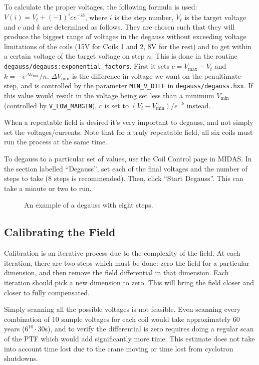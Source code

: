 \documentclass[twoside,letterpaper]{refart}
\begin{document}
To calculate the proper voltages, the following formula is used: \(V(i) = V_t + {(-1)}^i c e^{-ik}\), where \(i\) is the step number, \(V_t\) is the target voltage and \(c\) and \(k\) are determined as follows. They are chosen such that they will produce the biggest range of voltages in the degauss without exceeding voltage limitations of the coils (15V for Coils 1 and 2, 8V for the rest) and to get within a certain voltage of the target voltage on step \(n\). This is done in the routine \texttt{degauss/degauss:exponential\_factors}. First it sets \(c = V_\text{max} - V_t\) and \(k = -e^{\Delta V_\text{min}} / n\). \(\Delta V_\text{min}\) is the difference in voltage we want on the penultimate step, and is controlled by the parameter \texttt{MIN\_V\_DIFF} in \texttt{degauss/degauss.hxx}. If this value would result in the voltage being set less than a minimum $V_\text{min}$ (controlled by \texttt{V\_LOW\_MARGIN}), $c$ is set to $\left(V_t - V_\text{min}\right) / e^{-k}$ instead.

When a repeatable field is desired it's very important to degauss, and not simply set the voltages/currents. Note that for a truly repeatable field, all six coils must run the process at the same time.

To degauss to a particular set of values, use the Coil Control page in MIDAS. In the section labelled ``Degauss'', set each of the final voltages and the number of steps to take (8 steps is recommended). Then, click ``Start Degauss''. This can take a minute or two to run.

\FloatBarrier
\begin{figure}[!htb]\centering
  \resizebox{\textwidth}{!}{}
  \caption{An example of a degauss with eight steps.\label{fig:degauss}}
\end{figure}
\FloatBarrier

\subsection{Calibrating the Field}

Calibration is an iterative process due to the complexity of the field. At each iteration, there are two steps which must be done: zero the field for a particular dimension, and then remove the field differential in that dimension. Each iteration should pick a new dimension to zero. This will bring the field closer and closer to fully compensated.

Simply scanning all the possible voltages is not feasible. Even scanning every combination of 10 sample voltages for each coil would take approximately 60 years ($6^{10} \cdot 30\text{s}$), and to verify the differential is zero requires doing a regular scan of the PTF which would add significantly more time. This estimate does not take into account time lost due to the crane moving or time lost from cyclotron shutdowns.
\end{document}
